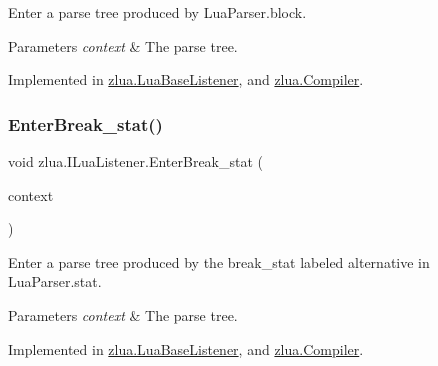 Enter a parse tree produced by Lua\+Parser.\+block. 


\begin{DoxyParams}{Parameters}
{\em context} & The parse tree.\\
\hline
\end{DoxyParams}


Implemented in \mbox{\hyperlink{classzlua_1_1_lua_base_listener_af7d5b6a200e1b7efe6886c7fdad9a0f3}{zlua.\+Lua\+Base\+Listener}}, and \mbox{\hyperlink{classzlua_1_1_compiler_a3bb0ad1158b35844611b3bbb75ff5521}{zlua.\+Compiler}}.

\mbox{\label{interfacezlua_1_1_i_lua_listener_aa77c8634ee96ca2069ceb9e93b2bae57}} 
\subsubsection{\texorpdfstring{Enter\+Break\+\_\+stat()}{EnterBreak\_stat()}}
{\footnotesize\ttfamily void zlua.\+I\+Lua\+Listener.\+Enter\+Break\+\_\+stat (\begin{DoxyParamCaption}\item[{\mbox{[}\+Not\+Null\mbox{]} \mbox{\hyperlink{classzlua_1_1_lua_parser_1_1_break__stat_context}{Lua\+Parser.\+Break\+\_\+stat\+Context}}}]{context }\end{DoxyParamCaption})}



Enter a parse tree produced by the {\ttfamily break\+\_\+stat} labeled alternative in Lua\+Parser.\+stat. 


\begin{DoxyParams}{Parameters}
{\em context} & The parse tree.\\
\hline
\end{DoxyParams}


Implemented in \mbox{\hyperlink{classzlua_1_1_lua_base_listener_a6adb675854ff8e7a3a92ca58e5f198b2}{zlua.\+Lua\+Base\+Listener}}, and \mbox{\hyperlink{classzlua_1_1_compiler_afb51cc611219670d5372b0d22f1026a3}{zlua.\+Compiler}}.

\mbox{\label{interfacezlua_1_1_i_lua_listener_ade4db31c82992f111a3093cde12fd632}} 
